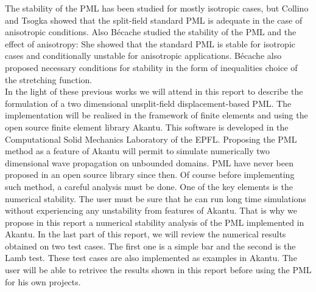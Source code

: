The stability of the PML has been studied for mostly isotropic cases, but Collino and Tsogka \cite{Collino} showed that the split-field standard PML is adequate in the case of anisotropic conditions. Also Bécache \cite{Becache} studied the stability of the PML and the effect of anisotropy: She showed that the standard PML is stable for isotropic cases and conditionally unstable for anisotropic applications. Bécache also proposed necessary conditions for stability in the form of inequalities choice of the stretching function.\\


In the light of these previous works we will attend in this report to describe the formulation of a two dimensional unsplit-field displacement-based PML. The implementation will be realised in the framework of finite elements and using the open source finite element library Akantu. This software is developed in the Computational Solid Mechanics Laboratory of the EPFL. Proposing the PML method as a feature of Akantu will permit to simulate numerically two dimensional wave propagation on unbounded domains. PML have never been proposed in an open source library since then. Of course before implementing such method, a careful analysis must be done. One of the key elements is the numerical stability. The user must be sure that he can run long time simulations without experiencing any unstability from features of Akantu. That is why we propose in this report a numerical stability analysis of the PML implemented in Akantu.    
In the last part of this report, we will review the numerical results obtained on two test cases. The first one is a simple bar and the second is the Lamb test. These test cases are also implemented as examples in Akantu. The user will be able to retrivee the results shown in this report before using the PML for his own projects.  














